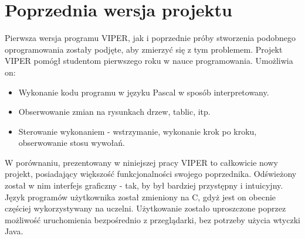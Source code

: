 \documentclass[a4paper,twoside,openright,11pt]{report}
\begin{document}
  \section{Poprzednia wersja projektu}
\par Pierwsza wersja programu VIPER, jak i poprzednie próby stworzenia podobnego oprogramowania zostały podjęte, aby zmierzyć się z tym problemem. Projekt VIPER pomógł studentom pierwszego roku w nauce programowania. Umożliwia on:
\begin{itemize}

  \item Wykonanie kodu programu w języku Pascal w sposób interpretowany.
  \item Obserwowanie zmian na rysunkach drzew, tablic, itp.
  \item Sterowanie wykonaniem - wstrzymanie, wykonanie krok po kroku, obserwowanie stosu wywołań.

\end{itemize}
 
\par W porównaniu, prezentowany w niniejszej pracy VIPER to całkowicie nowy projekt, posiadający większość funkcjonalności swojego poprzednika. Odświeżony został w nim interfejs graficzny - tak, by był bardziej przystępny i intuicyjny. Język programów użytkownika został zmieniony na C, gdyż jest on obecnie częściej wykorzystywany na uczelni. Użytkowanie zostało uproszczone poprzez możliwość uruchomienia bezpośrednio z przeglądarki, bez potrzeby użycia wtyczki Java.
\end{document}
